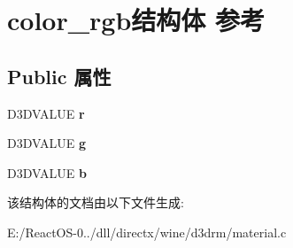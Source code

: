 \hypertarget{structcolor__rgb}{}\section{color\+\_\+rgb结构体 参考}
\label{structcolor__rgb}
\subsection*{Public 属性}
\begin{DoxyCompactItemize}
\item 
\mbox{\label{structcolor__rgb_a4efc8eedbb973b33c316257eeaab19e6}} 
D3\+D\+V\+A\+L\+UE {\bfseries r}
\item 
\mbox{\label{structcolor__rgb_ab790f52625e054d1a9e9f0e3fc588b9c}} 
D3\+D\+V\+A\+L\+UE {\bfseries g}
\item 
\mbox{\label{structcolor__rgb_aefd673bffdbe5fb5fe3cff31b0c050cb}} 
D3\+D\+V\+A\+L\+UE {\bfseries b}
\end{DoxyCompactItemize}


该结构体的文档由以下文件生成\+:\begin{DoxyCompactItemize}
\item 
E\+:/\+React\+O\+S-\/0../dll/directx/wine/d3drm/material.\+c\end{DoxyCompactItemize}
